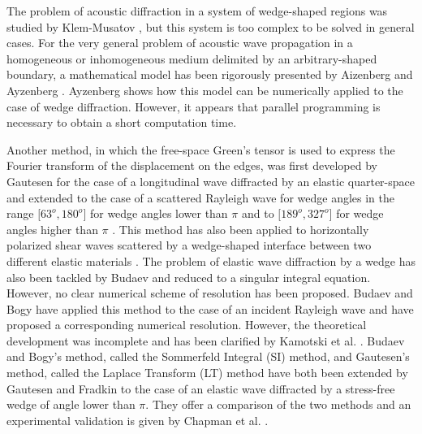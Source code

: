 The problem of acoustic diffraction in a system of wedge-shaped regions was studied by Klem-Musatov \cite{Klem-Musatov}, but this system is too complex to be solved in general cases. For the very general problem of acoustic wave propagation in a homogeneous or inhomogeneous medium delimited by an arbitrary-shaped boundary, a mathematical model has been rigorously presented by Aizenberg and Ayzenberg \cite{Aizenberg}. Ayzenberg \cite{Ayzenberg} shows how this model can be numerically applied to the case of wedge diffraction. However, it appears that parallel programming is necessary to obtain a short computation time.

Another method, in which the free-space Green's tensor is used to express the Fourier transform of the displacement on the edges, was first developed by Gautesen for the case of a longitudinal wave diffracted by an elastic quarter-space \cite{GautesenLwave} and extended to the case of a scattered Rayleigh wave for wedge angles in the range $\lbrack 63^o, 180^o \rbrack$ for wedge angles lower than $\pi$ \cite{GautesenRayleigh3,GautesenRayleigh} and to $\lbrack 189^o, 327^o \rbrack$ for wedge angles higher than $\pi$ \cite{GautesenRayleigh2}. This method has also been applied to horizontally polarized shear waves scattered by a wedge-shaped interface between two different elastic materials \cite{GautesenSHwave}. The problem of elastic wave diffraction by a wedge has also been tackled by Budaev \cite{Budaev,BudaevInclusion,BudaevBook} and reduced to a singular integral equation. However, no clear numerical scheme of resolution has been proposed. Budaev and Bogy \cite{Rayleigh} have applied this method to the case of an incident Rayleigh wave and have proposed a corresponding numerical resolution. However, the theoretical development was incomplete and has been clarified by Kamotski et al. \cite{KamotskiFradkin}. Budaev and Bogy's method, called the Sommerfeld Integral (SI) method, and Gautesen's method, called the Laplace Transform (LT) method have both been extended by Gautesen and Fradkin \cite{GautesenFradkin} to the case of an elastic wave diffracted by a stress-free wedge of angle lower than $\pi$. They offer a comparison of the two methods and an experimental validation is given by Chapman et al. \cite{ChapmanBurch}.

